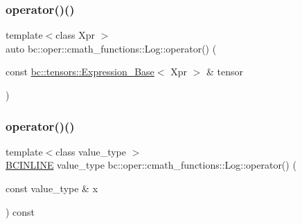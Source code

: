 \mbox{\label{structbc_1_1oper_1_1cmath__functions_1_1Log_a334a8c690074302aec8657fd3ce08a65}} 
\subsubsection{\texorpdfstring{operator()()}{operator()()}\hspace{0.1cm}{\footnotesize\ttfamily [2/3]}}
{\footnotesize\ttfamily template$<$class Xpr $>$ \\
auto bc\+::oper\+::cmath\+\_\+functions\+::\+Log\+::operator() (\begin{DoxyParamCaption}\item[{const \hyperlink{classbc_1_1tensors_1_1Expression__Base}{bc\+::tensors\+::\+Expression\+\_\+\+Base}$<$ Xpr $>$ \&}]{tensor }\end{DoxyParamCaption})\hspace{0.3cm}{\ttfamily [inline]}}

\mbox{\label{structbc_1_1oper_1_1cmath__functions_1_1Log_a68d70e7d6eb87fc8fa8e273ff8fdbe07}} 
\subsubsection{\texorpdfstring{operator()()}{operator()()}\hspace{0.1cm}{\footnotesize\ttfamily [3/3]}}
{\footnotesize\ttfamily template$<$class value\+\_\+type $>$ \\
\hyperlink{common_8h_a6699e8b0449da5c0fafb878e59c1d4b1}{B\+C\+I\+N\+L\+I\+NE} value\+\_\+type bc\+::oper\+::cmath\+\_\+functions\+::\+Log\+::operator() (\begin{DoxyParamCaption}\item[{const value\+\_\+type \&}]{x }\end{DoxyParamCaption}) const\hspace{0.3cm}{\ttfamily [inline]}}



